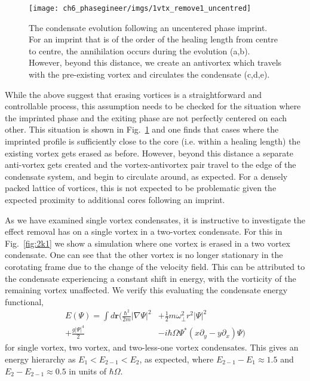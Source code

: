 \begin{figure}[H] \centering
    \texttt{[image: ch6\_phasegineer/imgs/1vtx\_remove1\_uncentred]}
    \caption{The condensate evolution following an uncentered phase imprint. For an imprint that is of the order of the healing length from centre to centre, the annihilation occurs during the evolution (a,b). However, beyond this distance, we create an antivortex which travels with the pre-existing vortex and circulates the condensate (c,d,e).}\label{fig:annihilation_1vtx_uncentred}
\end{figure}

While the above suggest that erasing vortices is a straightforward and controllable process, this assumption needs to be checked for the situation where the imprinted phase and the exiting phase are not perfectly centered on each other.
This situation is shown in Fig.~\ref{fig:annihilation_1vtx_uncentred} and one finds that cases where the imprinted profile is sufficiently close to the core (i.e. within a healing length) the existing vortex gets erased as before. However, beyond this distance a separate anti-vortex gets created and the vortex-antivortex pair travel to the edge of the condensate system, and begin to circulate around, as expected. For a densely packed lattice of vortices, this is not expected to be problematic given the expected proximity to additional cores following an imprint. %

As we have examined single vortex condensates, it is instructive to investigate the effect removal has on a single vortex in a two-vortex condensate. For this in Fig.~\ref{fig:2k1} we show a simulation where one vortex is erased in a two vortex condensate. One can see that the other vortex is no longer stationary in the corotating frame due to the change of the velocity field. This can be attributed to the condensate experiencing a constant shift in energy, with the vorticity of the remaining vortex unaffected. We verify this evaluating the condensate energy functional,
\begin{align}
    E(\Psi) = \int d\mathbf{r} \biggl( \frac{\hbar^2}{2m}|\nabla\Psi|^2 &+  \frac{1}{2}m\omega_\perp^2r^2|\Psi|^2 \nonumber\\ + \frac{g|\Psi|^4}{2} &- i\hbar\Omega\Psi^{*}(x\partial_y - y\partial_x)\Psi \biggr)
\end{align}
 for single vortex, two vortex, and two-less-one vortex condensates. This gives an energy hierarchy as $E_1 < E_{2-1} < E_2$, as expected, where $E_{2-1}-E_1\approx1.5$ and $E_2-E_{2-1}\approx 0.5$ in units of $\hbar\Omega$.

